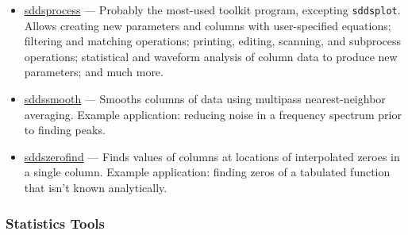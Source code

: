 \documentclass[11pt]{article}
\newcommand{\progref}[1]{\hyperref[#1]{#1}}
\begin{document}
\begin{itemize}
\item \progref{sddsprocess} --- Probably the most-used toolkit program, excepting \verb|sddsplot|.  Allows
creating new parameters and columns with user-specified equations; filtering and matching operations; printing,
editing, scanning, and subprocess operations; statistical and waveform analysis of column data to produce new
parameters; and much more.

\item \progref{sddssmooth} --- Smooths columns of data using multipass nearest-neighbor averaging.  Example
application: reducing noise in a frequency spectrum prior to finding peaks.

\item \progref{sddszerofind} --- Finds values of columns at locations of interpolated zeroes in a single column.
Example application: finding zeros of a tabulated function that isn't known analytically.

\end{itemize}

\subsubsection{Statistics Tools}
\end{document}
